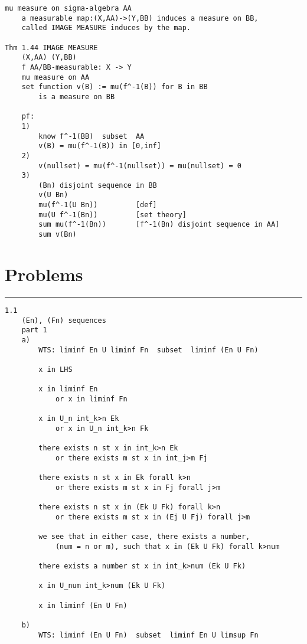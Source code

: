 \documentclass{article}
\begin{document}
\begin{flushleft}
\begin{verbatim}
mu measure on sigma-algebra AA 
    a measurable map:(X,AA)->(Y,BB) induces a measure on BB,
    called IMAGE MEASURE induces by the map.

Thm 1.44 IMAGE MEASURE 
    (X,AA) (Y,BB)
    f AA/BB-measurable: X -> Y
    mu measure on AA 
    set function v(B) := mu(f^-1(B)) for B in BB 
        is a measure on BB 
    
    pf:
    1)
        know f^-1(BB)  subset  AA  
        v(B) = mu(f^-1(B)) in [0,inf]
    2)
        v(nullset) = mu(f^-1(nullset)) = mu(nullset) = 0
    3)
        (Bn) disjoint sequence in BB 
        v(U Bn)
        mu(f^-1(U Bn))         [def]
        mu(U f^-1(Bn))         [set theory]
        sum mu(f^-1(Bn))       [f^-1(Bn) disjoint sequence in AA]
        sum v(Bn)
\end{verbatim}

\section*{Problems}
\bigbreak
\hrule
\bigbreak

\begin{verbatim}
1.1 
    (En), (Fn) sequences 
    part 1
    a)
        WTS: liminf En U liminf Fn  subset  liminf (En U Fn)

        x in LHS 

        x in liminf En 
            or x in liminf Fn 
        
        x in U_n int_k>n Ek 
            or x in U_n int_k>n Fk 
        
        there exists n st x in int_k>n Ek 
            or there exists m st x in int_j>m Fj 
        
        there exists n st x in Ek forall k>n 
            or there exists m st x in Fj forall j>m
        
        there exists n st x in (Ek U Fk) forall k>n
            or there exists m st x in (Ej U Fj) forall j>m

        we see that in either case, there exists a number, 
            (num = n or m), such that x in (Ek U Fk) forall k>num
        
        there exists a number st x in int_k>num (Ek U Fk)
        
        x in U_num int_k>num (Ek U Fk)

        x in liminf (En U Fn)

    b)
        WTS: liminf (En U Fn)  subset  liminf En U limsup Fn 


\end{verbatim}
\end{flushleft}
\end{document}
